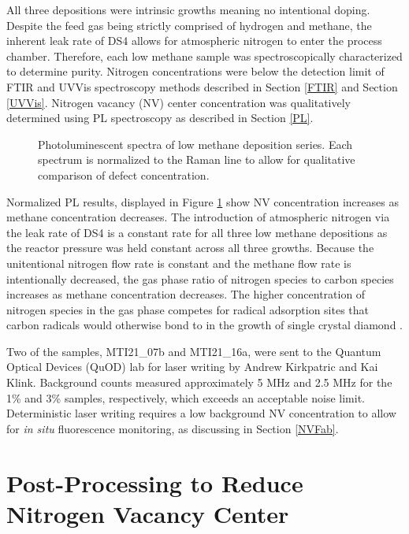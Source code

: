 All three depositions were intrinsic growths meaning no intentional doping. Despite the feed gas being strictly comprised of hydrogen and methane, the inherent leak rate of DS4 allows for atmospheric nitrogen to enter the process chamber. Therefore, each low methane sample was spectroscopically characterized to determine purity. Nitrogen concentrations were below the detection limit of FTIR and UVVis spectroscopy methods described in Section \ref{FTIR} and Section \ref{UVVis}. Nitrogen vacancy (NV) center concentration was qualitatively determined using PL spectroscopy as described in Section \ref{PL}.

\begin{figure}
    \centering
        
    \caption{Photoluminescent spectra of low methane deposition series. Each spectrum is normalized to the Raman line to allow for qualitative comparison of defect concentration.}
    \label{fig:PLLowCH4}
\end{figure}

Normalized PL results, displayed in Figure \ref{fig:PLLowCH4} show NV concentration increases as methane concentration decreases. The introduction of atmospheric nitrogen via the leak rate of DS4 is a constant rate for all three low methane depositions as the reactor pressure was held constant across all three growths. Because the unitentional nitrogen flow rate is constant and the methane flow rate is intentionally decreased, the gas phase ratio of nitrogen species to carbon species increases as methane concentration decreases. The higher concentration of nitrogen species in the gas phase competes for radical adsorption sites that carbon radicals would otherwise bond to in the growth of single crystal diamond \cite{Dunst2009GrowthEffect}.

Two of the samples, MTI21\_07b and MTI21\_16a, were sent to the Quantum Optical Devices (QuOD) lab for laser writing by Andrew Kirkpatric and Kai Klink. Background counts measured approximately 5 MHz and 2.5 MHz for the 1\% and 3\% samples, respectively, which exceeds an acceptable noise limit. Deterministic laser writing requires a low background NV concentration to allow for \textit{in situ} fluorescence monitoring, as discussing in Section \ref{NVFab}. 

\section{Post-Processing to Reduce Nitrogen Vacancy Center}
\indent

